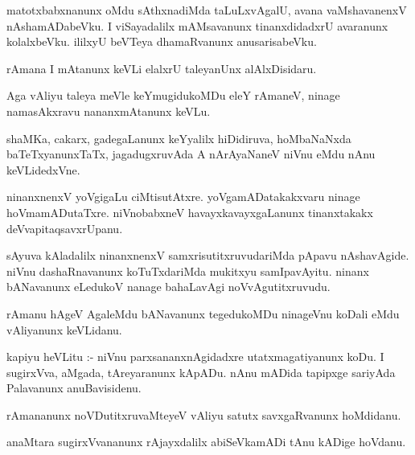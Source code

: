 \documentclass{article}
\begin{document}
\begin{mn}
matotxbabxnanunx  oMdu  sAthxnadiMda  taLuLxvAgalU,  avana  vaMshavanenxV  nAshamADabeVku.  I  viSayadalilx  mAMsavanunx  
tinanxdidadxrU  avaranunx  kolalxbeVku.  ililxyU  beVTeya  dhamaRvanunx  anusarisabeVku.
\end{mn}

\begin{mn}
rAmana  I  mAtanunx  keVLi  elalxrU  taleyanUnx  alAlxDisidaru.
\end{mn}

\begin{mn}
Aga  vAliyu  taleya  meVle  keYmugidukoMDu  eleY  rAmaneV,  ninage  namasAkxravu  nananxmAtanunx  keVLu.
\end{mn}

\begin{mn}
shaMKa,  cakarx,  gadegaLanunx  keYyalilx  hiDidiruva,  hoMbaNaNxda  baTeTxyanunxTaTx,  jagadugxruvAda  A  nArAyaNaneV  niVnu  
eMdu  nAnu  keVLidedxVne.
\end{mn}

\begin{mn}
ninanxnenxV  yoVgigaLu  ciMtisutAtxre.  yoVgamADatakakxvaru  ninage  hoVmamADutaTxre.  niVnobabxneV  havayxkavayxgaLanunx  
tinanxtakakx  deVvapitaqsavxrUpanu.
\end{mn}

\begin{mn}
sAyuva  kAladalilx  ninanxnenxV  samxrisutitxruvudariMda  pApavu  nAshavAgide.  niVnu  dashaRnavanunx  koTuTxdariMda  mukitxyu  
samIpavAyitu.  ninanx  bANavanunx  eLedukoV  nanage  bahaLavAgi  noVvAgutitxruvudu.
\end{mn}

\begin{mn}
rAmanu  hAgeV  AgaleMdu  bANavanunx  tegedukoMDu  ninageVnu  koDali  eMdu  vAliyanunx  keVLidanu.
\end{mn}

\begin{mn}
kapiyu  heVLitu :- niVnu  parxsananxnAgidadxre  utatxmagatiyanunx  koDu.  I  sugirxVva,  aMgada,  tAreyaranunx  kApADu.  nAnu  
mADida  tapipxge  sariyAda  Palavanunx  anuBavisidenu.
\end{mn}

\begin{mn}
rAmananunx  noVDutitxruvaMteyeV  vAliyu  satutx  savxgaRvanunx  hoMdidanu.
\end{mn}

\begin{mn}
anaMtara  sugirxVvananunx  rAjayxdalilx  abiSeVkamADi  tAnu  kADige  hoVdanu.
\end{mn}
\end{document}
